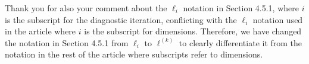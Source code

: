 \documentclass[11pt]{report}
\begin{document}

Thank you for also your comment about the $\ell_i$ notation in Section 4.5.1, where $i$ is the subscript for the diagnostic iteration, conflicting with the $\ell_i$ notation used in the article where $i$ is the subscript for dimensions. Therefore, we have changed the notation in Section 4.5.1 from $\ell_i$ to $\ell^{(k)}$ to clearly differentiate it from the notation in the rest of the article where subscripts refer to dimensions.






\end{document}
